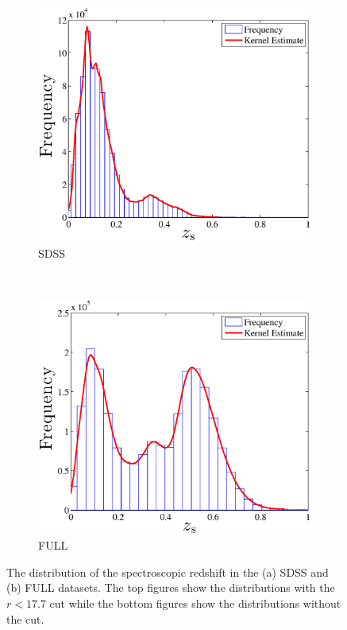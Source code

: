 \documentclass[useAMS,usenatbib,fleqn]{mn2e}
\begin{document}
\begin{figure}
        
       \begin{subfigure}[b]{0.45\textwidth}
                \includegraphics[width=\textwidth]{figures/zspec_sdss.eps}
                \caption{SDSS}
        \end{subfigure}
        ~
        \begin{subfigure}[b]{0.45\textwidth}
                \includegraphics[width=\textwidth]{figures/zspec_boss.eps}
                \caption{FULL}
        \end{subfigure}

        
        \caption{The distribution of the spectroscopic redshift in the (a) SDSS and (b) FULL datasets. The top figures show the distributions with the $r<17.7$ cut while the bottom figures show the distributions without the cut.}
        \label{fig-zpec-sdss}
\end{figure}
\end{document}
